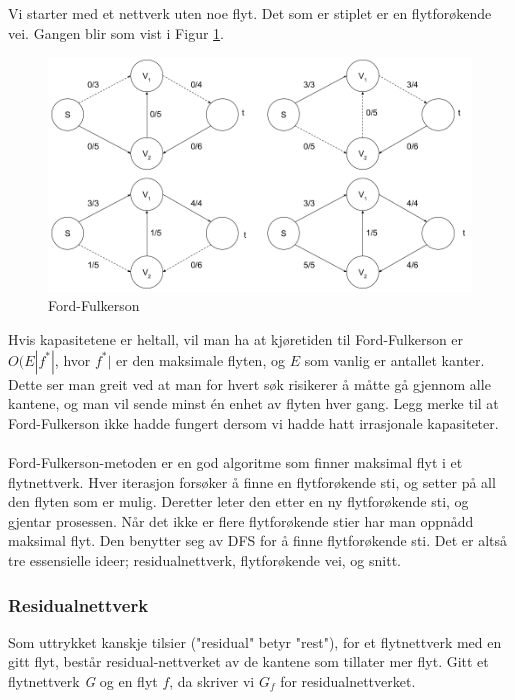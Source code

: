 \begin{boxed}
Vi starter med et nettverk uten noe flyt. Det som er stiplet er en flytforøkende vei. Gangen blir som vist i Figur \ref{fig:ford-fulkerson}.

\begin{figure}[H]
\includegraphics[scale=0.45]{images/ford-fulkerson}
\centering %
\caption{Ford-Fulkerson}
\label{fig:ford-fulkerson}
\end{figure}
\end{boxed}

\noindent Hvis kapasitetene er heltall, vil man ha at kjøretiden til Ford-Fulkerson er $O(E|f^*|$, hvor $f^*|$ er den maksimale flyten, og $E$ som vanlig er antallet kanter. Dette ser man greit ved at man for hvert søk risikerer å måtte gå gjennom alle kantene, og man vil sende minst én enhet av flyten hver gang. Legg merke til at Ford-Fulkerson ikke hadde fungert dersom vi hadde hatt irrasjonale kapasiteter.  
\\\\
Ford-Fulkerson-metoden er en god algoritme som finner maksimal flyt i et flytnettverk. Hver iterasjon forsøker å finne en flytforøkende sti, og setter på all den flyten som er mulig. Deretter leter den etter en ny flytforøkende sti, og gjentar prosessen. Når det ikke er flere flytforøkende stier har man oppnådd maksimal flyt. Den benytter seg av DFS for å finne flytforøkende sti. Det er altså tre essensielle ideer; residualnettverk, flytforøkende vei, og snitt.\\

\subsubsection{Residualnettverk}
Som uttrykket kanskje tilsier ("residual" betyr "rest"), for et flytnettverk med en gitt flyt, består residual-nettverket av de kantene som tillater mer flyt. Gitt et flytnettverk \textit{G} og en flyt $f$, da skriver vi $G_f$ for residualnettverket.

